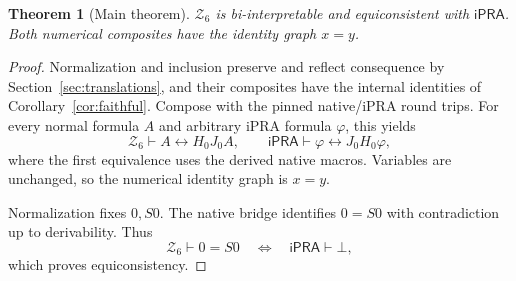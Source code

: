 \documentclass[11pt]{article}
\newtheorem{theorem}{Theorem}[section]
\newcommand{\IPRA}{\mathsf{iPRA}}
\newcommand{\Zsix}{\mathcal Z_6}
\begin{document}
\begin{theorem}[Main theorem]\label{thm:main}
\(\Zsix\) is bi-interpretable and equiconsistent with \(\IPRA\).
Both numerical composites have the identity graph \(x=y\).
\end{theorem}
\begin{proof}
Normalization and inclusion preserve and reflect consequence by
Section~\ref{sec:translations}, and their composites have the internal
identities of Corollary~\ref{cor:faithful}. Compose with the pinned
native/iPRA round trips. For every normal formula \(A\) and arbitrary
iPRA formula \(\varphi\), this yields
\[
 \Zsix\vdash A\leftrightarrow H_0J_0A,\qquad
 \IPRA\vdash\varphi\leftrightarrow J_0H_0\varphi ,
\]
where the first equivalence uses the derived native macros.
Variables are unchanged, so the numerical identity graph is \(x=y\).

Normalization fixes \(0,S0\). The native bridge identifies
\(0=S0\) with contradiction up to derivability. Thus
\[
                   \Zsix\vdash0=S0
           \quad\Longleftrightarrow\quad\IPRA\vdash\bot ,
\]
which proves equiconsistency.
\end{proof}
\end{document}
